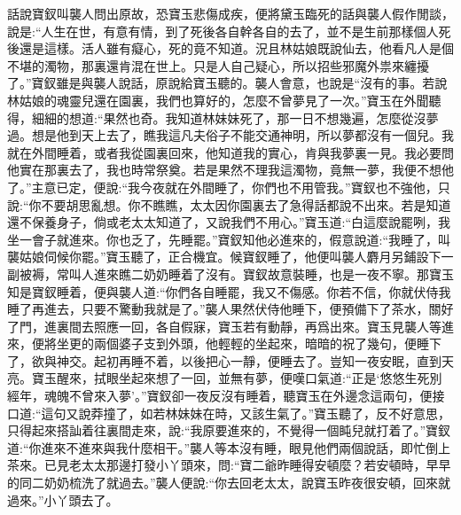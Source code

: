 


\begin{parag}
    話說寶釵叫襲人問出原故，恐寶玉悲傷成疾，便將黛玉臨死的話與襲人假作閒談，說是:“人生在世，有意有情，到了死後各自幹各自的去了，並不是生前那樣個人死後還是這樣。活人雖有癡心，死的竟不知道。況且林姑娘既說仙去，他看凡人是個不堪的濁物，那裏還肯混在世上。只是人自己疑心，所以招些邪魔外祟來纏擾了。”寶釵雖是與襲人說話，原說給寶玉聽的。襲人會意，也說是“沒有的事。若說林姑娘的魂靈兒還在園裏，我們也算好的，怎麼不曾夢見了一次。”寶玉在外聞聽得，細細的想道:“果然也奇。我知道林妹妹死了，那一日不想幾遍，怎麼從沒夢過。想是他到天上去了，瞧我這凡夫俗子不能交通神明，所以夢都沒有一個兒。我就在外間睡着，或者我從園裏回來，他知道我的實心，肯與我夢裏一見。我必要問他實在那裏去了，我也時常祭奠。若是果然不理我這濁物，竟無一夢，我便不想他了。”主意已定，便說:“我今夜就在外間睡了，你們也不用管我。”寶釵也不強他，只說:“你不要胡思亂想。你不瞧瞧，太太因你園裏去了急得話都說不出來。若是知道還不保養身子，倘或老太太知道了，又說我們不用心。”寶玉道:“白這麼說罷咧，我坐一會子就進來。你也乏了，先睡罷。”寶釵知他必進來的，假意說道:“我睡了，叫襲姑娘伺候你罷。”寶玉聽了，正合機宜。候寶釵睡了，他便叫襲人麝月另鋪設下一副被褥，常叫人進來瞧二奶奶睡着了沒有。寶釵故意裝睡，也是一夜不寧。那寶玉知是寶釵睡着，便與襲人道:“你們各自睡罷，我又不傷感。你若不信，你就伏侍我睡了再進去，只要不驚動我就是了。”襲人果然伏侍他睡下，便預備下了茶水，關好了門，進裏間去照應一回，各自假寐，寶玉若有動靜，再爲出來。寶玉見襲人等進來，便將坐更的兩個婆子支到外頭，他輕輕的坐起來，暗暗的祝了幾句，便睡下了，欲與神交。起初再睡不着，以後把心一靜，便睡去了。豈知一夜安眠，直到天亮。寶玉醒來，拭眼坐起來想了一回，並無有夢，便嘆口氣道:“正是‘悠悠生死別經年，魂魄不曾來入夢’。”寶釵卻一夜反沒有睡着，聽寶玉在外邊念這兩句，便接口道:“這句又說莽撞了，如若林妹妹在時，又該生氣了。”寶玉聽了，反不好意思，只得起來搭訕着往裏間走來，說:“我原要進來的，不覺得一個盹兒就打着了。”寶釵道:“你進來不進來與我什麼相干。”襲人等本沒有睡，眼見他們兩個說話，即忙倒上茶來。已見老太太那邊打發小丫頭來，問:“寶二爺昨睡得安頓麼？若安頓時，早早的同二奶奶梳洗了就過去。”襲人便說:“你去回老太太，說寶玉昨夜很安頓，回來就過來。”小丫頭去了。
\end{parag}



